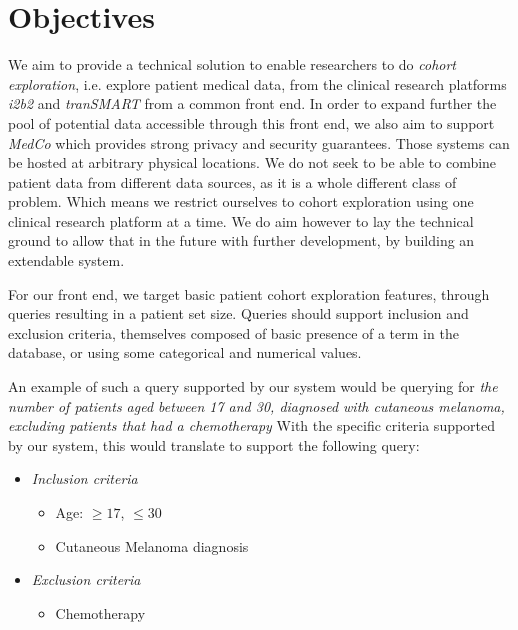 \section{Objectives}

We aim to provide a technical solution to enable researchers to do \emph{cohort exploration}, i.e. explore patient medical data, from the clinical research platforms \emph{i2b2} and \emph{tranSMART} from a common front end.
In order to expand further the pool of potential data accessible through this front end, we also aim to support \emph{MedCo} which provides strong privacy and security guarantees.
Those systems can be hosted at arbitrary physical locations.
We do not seek to be able to combine patient data from different data sources, as it is a whole different class of problem.
Which means we restrict ourselves to cohort exploration using one clinical research platform at a time.
We do aim however to lay the technical ground to allow that in the future with further development, by building an extendable system.

For our front end, we target basic patient cohort exploration features, through queries resulting in a patient set size.
Queries should support inclusion and exclusion criteria, themselves composed of basic presence of a term in the database, or using some categorical and numerical values.

An example of such a query supported by our system would be querying for
\emph{the number of patients aged between 17 and 30, diagnosed with cutaneous melanoma, excluding patients that had a chemotherapy}
With the specific criteria supported by our system, this would translate to support the following query:
\begin{itemize}
    \item \emph{Inclusion criteria}
    \begin{itemize}
        \item Age: $\geq 17$, $\leq 30$
        \item Cutaneous Melanoma diagnosis
    \end{itemize}
    
    \item \emph{Exclusion criteria}
    \begin{itemize}
        \item Chemotherapy
    \end{itemize}
\end{itemize}


